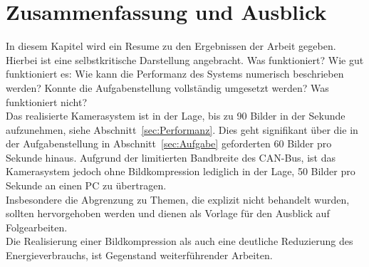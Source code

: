 \chapter{Zusammenfassung und Ausblick}

In diesem Kapitel wird ein Resume zu den Ergebnissen der Arbeit gegeben.
Hierbei ist eine selbstkritische Darstellung angebracht. Was funktioniert? Wie gut funktioniert es: Wie kann die Performanz des Systems numerisch beschrieben werden? Konnte die Aufgabenstellung vollständig umgesetzt werden? Was funktioniert nicht? \\

\example Das realisierte Kamerasystem ist in der Lage, bis zu 90 Bilder in der Sekunde aufzunehmen, siehe Abschnitt~\ref{sec:Performanz}. Dies geht signifikant über die in der Aufgabenstellung in Abschnitt~\ref{sec:Aufgabe} geforderten 60 Bilder pro Sekunde hinaus. Aufgrund der limitierten Bandbreite des CAN-Bus, ist das Kamerasystem jedoch ohne Bildkompression lediglich in der Lage, 50 Bilder pro Sekunde an einen PC zu übertragen.\\

Insbesondere die Abgrenzung zu Themen, die explizit nicht behandelt wurden, sollten hervorgehoben werden und dienen als Vorlage für den Ausblick auf Folgearbeiten. \\

\example Die Realisierung einer Bildkompression als auch eine deutliche Reduzierung des Energieverbrauchs, ist Gegenstand weiterführender Arbeiten.
